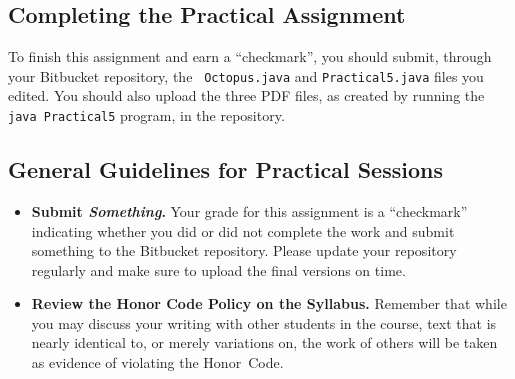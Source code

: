 \vspace*{-.3in}
\subsection*{Completing the Practical Assignment}
\vspace*{-.1in}

To finish this assignment and earn a ``checkmark'', you should submit, through your Bitbucket repository, the {\tt
  Octopus.java} and {\tt Practical5.java} files you edited. You should also upload the three PDF files, as created by
running the {\tt java Practical5} program, in the repository.

\vspace*{-.15in}
\subsection*{General Guidelines for Practical Sessions}
\vspace*{-.05in}
\begin{itemize}

\item {\bf Submit \textbf{\textit{Something}}.} Your grade for this assignment is a ``checkmark'' indicating whether you
  did or did not complete the work and submit something to the Bitbucket repository. Please update your repository
  regularly and make sure to upload the final versions on time.


\item {\bf Review the Honor Code Policy on the Syllabus.} Remember that while you may discuss your writing with other
  students in the course, text that is nearly identical to, or merely variations on, the work of others will be
  taken as evidence of violating the \mbox{Honor Code}.
\end{itemize}



